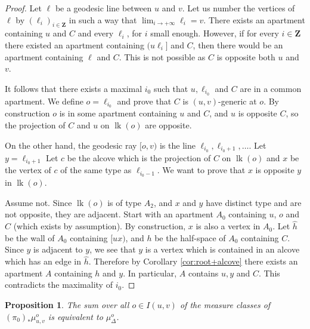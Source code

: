 \documentclass[a4paper, 11pt]{article}
\theoremstyle{plain}
\newtheorem{proposition}{Proposition}[section]
\theoremstyle{definition}
\theoremstyle{remark}
\newcommand{\ZZ}{\mathbf{Z}}                          %
\DeclareMathOperator{\lk}{lk}
\begin{document}
\begin{proof}
Let $\ell$ be a geodesic line between $u$ and $v$. Let us number the vertices of $\ell$ by $(\ell_i)_{i\in \ZZ}$ in such a way that $\lim_{i\to +\infty} \ell_i =v$. 
 There exists an apartment containing $u$ and $C$ and every $\ell_i$, for $i$ small enough. However, if for every $i\in \ZZ$ there existed an apartment containing $(u\ell_i]$ and $C$, then there would be an apartment containing $\ell$ and $C$. This is not possible as $C$ is opposite both $u$ and $v$.

It follows that there exists a maximal $i_0$ such that $u,\ell_{i_0}$ and $C$ are in a common apartment. We define $o=\ell_{i_0}$ and prove that $C$ is $(u,v)$-generic at $o$. By construction $o$ is in some apartment containing $u$ and $C$, and $u$ is opposite $C$, so the projection of $C$ and $u$ on $\lk(o)$ are opposite.

On the other hand, the geodesic ray $[o,v)$ is the line $\ell_{i_0},\ell_{i_0+1},\dots$. Let $y=\ell_{i_0+1}$ Let $c$ be the alcove which is the projection of $C$ on $\lk(o)$ and $x$ be the vertex of $c$ of the same type as $\ell_{i_0-1}$. We want to prove that $x$ is opposite $y$ in $\lk(o)$.


Assume not. Since $\lk(o)$ is of type $A_2$, and $x$ and $y$ have distinct type and are not opposite, they are adjacent.
Start with an apartment $A_0$ containing $u$, $o$ and $C$ (which exists by assumption). By construction, $x$ is also a vertex in $A_0$. Let $\hat h$ be the wall of $A_0$ containing $[ux)$, and $h$ be the half-space of $A_0$ containing $C$. Since $y$ is adjacent to $y$, we see that $y$ is a vertex which is contained in an alcove which has an edge in $\hat h$. Therefore by Corollary \ref{cor:root+alcove} there exists an apartment $A$ containing $h$ and $y$. In particular, $A$ contains $u,y $ and $C$. This contradicts the maximality of $i_0$.


\end{proof}

\begin{proposition}\label{prop:sumpi0}
The sum over all $o\in I(u,v)$ of the measure classes of $(\pi_0)_*\mu_{u,v}^o$ is equivalent to $\mu_\Delta^o$.
\end{proposition}
\end{document}
